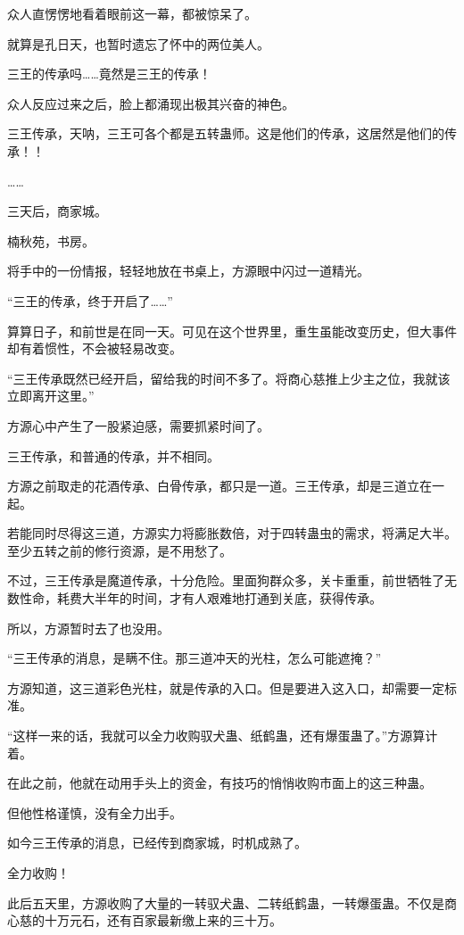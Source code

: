 \begin{this_body}
众人直愣愣地看着眼前这一幕，都被惊呆了。

就算是孔日天，也暂时遗忘了怀中的两位美人。

三王的传承吗……竟然是三王的传承！

众人反应过来之后，脸上都涌现出极其兴奋的神色。

三王传承，天呐，三王可各个都是五转蛊师。这是他们的传承，这居然是他们的传承！！

……

三天后，商家城。

楠秋苑，书房。

将手中的一份情报，轻轻地放在书桌上，方源眼中闪过一道精光。

“三王的传承，终于开启了……”

算算日子，和前世是在同一天。可见在这个世界里，重生虽能改变历史，但大事件却有着惯性，不会被轻易改变。

“三王传承既然已经开启，留给我的时间不多了。将商心慈推上少主之位，我就该立即离开这里。”

方源心中产生了一股紧迫感，需要抓紧时间了。

三王传承，和普通的传承，并不相同。

方源之前取走的花酒传承、白骨传承，都只是一道。三王传承，却是三道立在一起。

若能同时尽得这三道，方源实力将膨胀数倍，对于四转蛊虫的需求，将满足大半。至少五转之前的修行资源，是不用愁了。

不过，三王传承是魔道传承，十分危险。里面狗群众多，关卡重重，前世牺牲了无数性命，耗费大半年的时间，才有人艰难地打通到关底，获得传承。

所以，方源暂时去了也没用。

“三王传承的消息，是瞒不住。那三道冲天的光柱，怎么可能遮掩？”

方源知道，这三道彩色光柱，就是传承的入口。但是要进入这入口，却需要一定标准。

“这样一来的话，我就可以全力收购驭犬蛊、纸鹤蛊，还有爆蛋蛊了。”方源算计着。

在此之前，他就在动用手头上的资金，有技巧的悄悄收购市面上的这三种蛊。

但他性格谨慎，没有全力出手。

如今三王传承的消息，已经传到商家城，时机成熟了。

全力收购！

此后五天里，方源收购了大量的一转驭犬蛊、二转纸鹤蛊，一转爆蛋蛊。不仅是商心慈的十万元石，还有百家最新缴上来的三十万。


\end{this_body}
